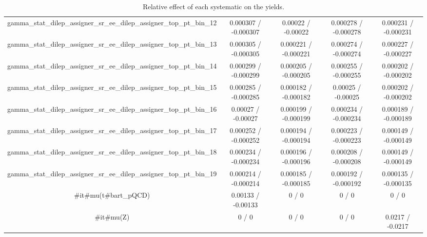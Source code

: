 \documentclass[10pt]{article}
\begin{document}
\begin{table}[htbp]
\begin{center}
\begin{tabular}{|c|c|c|c|c|}
  gamma_stat_dilep_assigner_sr_ee_dilep_assigner_top_pt_bin_12 & 0.000307 / -0.000307 & 0.00022 / -0.00022 & 0.000278 / -0.000278 & 0.000231 / -0.000231 \\ 
  gamma_stat_dilep_assigner_sr_ee_dilep_assigner_top_pt_bin_13 & 0.000305 / -0.000305 & 0.000221 / -0.000221 & 0.000274 / -0.000274 & 0.000227 / -0.000227 \\ 
  gamma_stat_dilep_assigner_sr_ee_dilep_assigner_top_pt_bin_14 & 0.000299 / -0.000299 & 0.000205 / -0.000205 & 0.000255 / -0.000255 & 0.000202 / -0.000202 \\ 
  gamma_stat_dilep_assigner_sr_ee_dilep_assigner_top_pt_bin_15 & 0.000285 / -0.000285 & 0.000182 / -0.000182 & 0.00025 / -0.00025 & 0.000202 / -0.000202 \\ 
  gamma_stat_dilep_assigner_sr_ee_dilep_assigner_top_pt_bin_16 & 0.00027 / -0.00027 & 0.000199 / -0.000199 & 0.000234 / -0.000234 & 0.000189 / -0.000189 \\ 
  gamma_stat_dilep_assigner_sr_ee_dilep_assigner_top_pt_bin_17 & 0.000252 / -0.000252 & 0.000194 / -0.000194 & 0.000223 / -0.000223 & 0.000149 / -0.000149 \\ 
  gamma_stat_dilep_assigner_sr_ee_dilep_assigner_top_pt_bin_18 & 0.000234 / -0.000234 & 0.000196 / -0.000196 & 0.000208 / -0.000208 & 0.000149 / -0.000149 \\ 
  gamma_stat_dilep_assigner_sr_ee_dilep_assigner_top_pt_bin_19 & 0.000214 / -0.000214 & 0.000185 / -0.000185 & 0.000192 / -0.000192 & 0.000135 / -0.000135 \\ 
  #it{#mu}(t#bar{t}_{pQCD}) & 0.00133 / -0.00133 & 0 / 0 & 0 / 0 & 0 / 0 \\ 
  #it{#mu}(Z) & 0 / 0 & 0 / 0 & 0 / 0 & 0.0217 / -0.0217 \\ 
\hline 
\end{tabular} 
\caption{Relative effect of each systematic on the yields.} 
\end{center} 
\end{table} 
\end{document}
